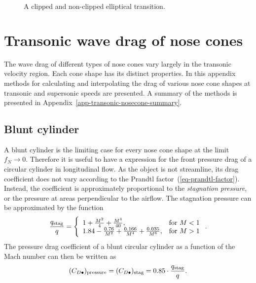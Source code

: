 \begin{figure}[p]
\vspace{5mm}
\begin{center}
\end{center}
\caption{A clipped and non-clipped elliptical transition.}
\label{fig-transition-clip}
\end{figure}





\chapter{Transonic wave drag of nose cones}
\label{app-nosecone-drag-method}

The wave drag of different types of nose cones vary largely in the
transonic velocity region.  Each cone shape has its distinct
properties.  In this appendix methods for calculating and
interpolating the drag of various nose cone shapes at transonic and
supersonic speeds are presented.  A summary of the methods is
presented in Appendix~\ref{app-transonic-nosecone-summary}.



\section{Blunt cylinder}
\label{app-blunt-cylinder-drag}

A blunt cylinder is the limiting case for every nose cone shape at the
limit $f_N\rightarrow 0$.  Therefore it is useful to have a expression
for the front pressure drag of a circular cylinder in longitudinal
flow.  As the object is not streamline, its drag coefficient does not
vary according to the Prandtl factor~(\ref{eq-prandtl-factor}).
Instead, the coefficient is approximately proportional to the
{\it stagnation pressure}, or the pressure at areas perpendicular to
the airflow.  The stagnation pressure can be approximated by the
function~\cite[pp.~15-2,~16-3]{hoerner}
%
\begin{equation}
\frac{q_{\rm stag}}{q} =
\left\{
\begin{array}{ll}
1 + \frac{M^2}{4} + \frac{M^4}{40}, & \mbox{for\ } M < 1 \\
1.84 - \frac{0.76}{M^2} + \frac{0.166}{M^4} + \frac{0.035}{M^6}, &
   \mbox{for\ } M > 1
\end{array}
\right. .
\end{equation}
%
The pressure drag coefficient of a blunt circular cylinder as a
function of the Mach number can then be written as
%
\begin{equation}
(C_{D\bullet})_{\rm pressure} = 
(C_{D\bullet})_{\rm stag} = 0.85 \cdot \frac{q_{\rm stag}}{q}.
\label{eq-blunt-cylinder-drag}
\end{equation}





